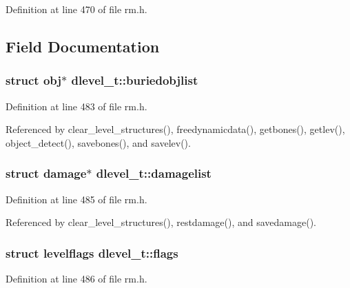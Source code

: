 Definition at line 470 of file rm.\+h.



\subsection{Field Documentation}
\hypertarget{structdlevel__t_a3f47ab569a36a0574eb4363915fe2fae}{
\subsubsection[{buriedobjlist}]{\setlength{\rightskip}{0pt plus 5cm}struct {\bf obj}$\ast$ dlevel\+\_\+t\+::buriedobjlist}}\label{structdlevel__t_a3f47ab569a36a0574eb4363915fe2fae}


Definition at line 483 of file rm.\+h.



Referenced by clear\+\_\+level\+\_\+structures(), freedynamicdata(), getbones(), getlev(), object\+\_\+detect(), savebones(), and savelev().

\hypertarget{structdlevel__t_a32cc1062d668db12f8f02ff2ea0d3fcd}{
\subsubsection[{damagelist}]{\setlength{\rightskip}{0pt plus 5cm}struct {\bf damage}$\ast$ dlevel\+\_\+t\+::damagelist}}\label{structdlevel__t_a32cc1062d668db12f8f02ff2ea0d3fcd}


Definition at line 485 of file rm.\+h.



Referenced by clear\+\_\+level\+\_\+structures(), restdamage(), and savedamage().

\hypertarget{structdlevel__t_ad52c01d015e2456cdae3300848115916}{
\subsubsection[{flags}]{\setlength{\rightskip}{0pt plus 5cm}struct {\bf levelflags} dlevel\+\_\+t\+::flags}}\label{structdlevel__t_ad52c01d015e2456cdae3300848115916}


Definition at line 486 of file rm.\+h.



